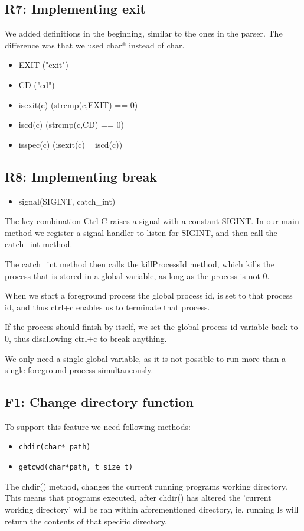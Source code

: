 \subsection{R7: Implementing exit}
We added definitions in the beginning, similar to the ones in the parser. The difference was that we used char* instead of char.
\begin{itemize}
\item EXIT	("exit")
\item CD      ("cd")
\item isexit(c) (strcmp(c,EXIT) == 0)
\item iscd(c) (strcmp(c,CD) == 0)
\item isspec(c) (isexit(c) || iscd(c))
\end{itemize}


\subsection{R8: Implementing break}
\begin{itemize}
\item signal(SIGINT, catch\_int)
\end{itemize}

The key combination Ctrl-C raises a signal with a constant SIGINT.
In our main method we register a signal handler to listen for SIGINT, and then call the catch\_int method.

The catch\_int method then calls the killProcessId method, which kills the process that is stored in a global variable, as long as the process is not 0.

When we start a foreground process the global process id, is set to that process id, and thus ctrl+c enables us to terminate that process.

If the process should finish by itself, we set the global process id variable back to 0, thus disallowing ctrl+c to break anything.

We only need a single global variable, as it is not possible to run more than a single foreground process simultaneously. 

\subsection{F1: Change directory function}
To support this feature we need following methods:
\begin{itemize}
\item \begin{verbatim}chdir(char* path)
\end{verbatim}
\item \begin{verbatim}getcwd(char*path, t_size t)
\end{verbatim}
\end{itemize}
The chdir() method, changes the current running programs working directory. This means that programs executed, after chdir() has altered the 'current working directory' will be ran within aforementioned directory, ie. running ls will return the contents of that specific directory.\\

